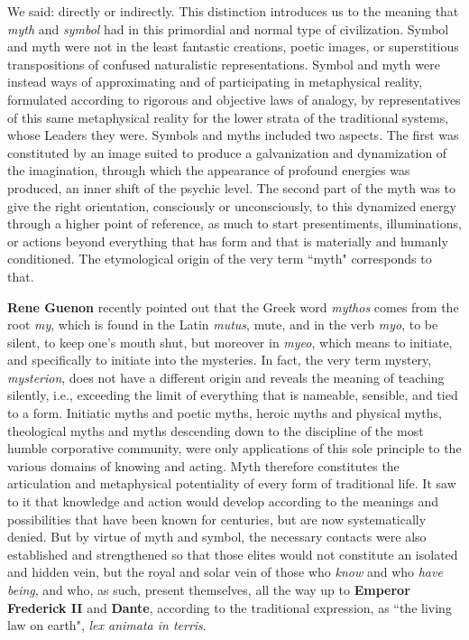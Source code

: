 We said: directly or indirectly. This distinction introduces us to the meaning that \emph{myth} and \emph{symbol} had in this primordial and normal type of civilization. Symbol and myth were not in the least fantastic creations, poetic images, or superstitious transpositions of confused naturalistic representations. Symbol and myth were instead ways of approximating and of participating in metaphysical reality, formulated according to rigorous and objective laws of analogy, by representatives of this same metaphysical reality for the lower strata of the traditional systems, whose Leaders they were. Symbols and myths included two aspects. The first was constituted by an image suited to produce a galvanization and dynamization of the imagination, through which the appearance of profound energies was produced, an inner shift of the psychic level. The second part of the myth was to give the right orientation, consciously or unconsciously, to this dynamized energy through a higher point of reference, as much to start presentiments, illuminations, or actions beyond everything that has form and that is materially and humanly conditioned. The etymological origin of the very term ``myth" corresponds to that.

\textbf{Rene Guenon} recently pointed out that the Greek word \emph{mythos} comes from the root \emph{my}, which is found in the Latin \emph{mutus}, mute, and in the verb \emph{myo}, to be silent, to keep one's mouth shut, but moreover in \emph{myeo}, which means to initiate, and specifically to initiate into the mysteries. In fact, the very term mystery, \emph{mysterion}, does not have a different origin and reveals the meaning of teaching silently, i.e., exceeding the limit of everything that is nameable, sensible, and tied to a form. Initiatic myths and poetic myths, heroic myths and physical myths, theological myths and myths descending down to the discipline of the most humble corporative community, were only applications of this sole principle to the various domains of knowing and acting. Myth therefore constitutes the articulation and metaphysical potentiality of every form of traditional life. It saw to it that knowledge and action would develop according to the meanings and possibilities that have been known for centuries, but are now systematically denied. But by virtue of myth and symbol, the necessary contacts were also established and strengthened so that those elites would not constitute an isolated and hidden vein, but the royal and solar vein of those who \emph{know} and who \emph{have being}, and who, as such, present themselves, all the way up to \textbf{Emperor Frederick II} and \textbf{Dante}, according to the traditional expression, as ``the living law on earth", \emph{lex animata in terris}.

